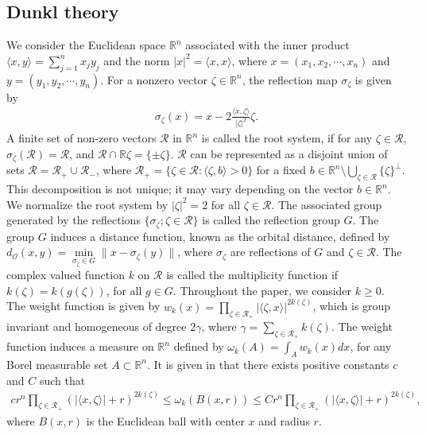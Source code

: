 \documentclass[11pt, reqno]{amsproc}
\theoremstyle{definition}
\theoremstyle{remark}
\numberwithin{equation}{section}
\begin{document}
\subsection{Dunkl theory}
We consider the Euclidean space $\mathbb{R}^n$ associated with the inner product $\langle x, y \rangle = \sum_{j=1}^n x_jy_j$ and the norm $|x|^2= \langle x,x \rangle$, where $x=(x_1,x_2,\cdots, x_n )$ and $y=(y_1,y_2,\cdots, y_n)$. For a nonzero vector $\zeta \in \mathbb{R}^n$, the reflection map $\sigma_\zeta$ is given by 
\begin{align*}
    \sigma_\zeta(x)=x-2\frac{\langle x, \zeta \rangle}{|\zeta|^2}\zeta.
\end{align*} 
 A finite set of non-zero vectors $\mathcal{R}$ in $\mathbb{R}^n$ is called the root system, if for any $\zeta \in \mathcal{R}$, $\sigma_\zeta(\mathcal{R})=\mathcal{R}$, and $\mathcal{R}\cap \mathbb{R}\zeta=\{ \pm\zeta\}$. $\mathcal{R}$ can be represented as a disjoint union of sets $\mathcal{R}=\mathcal{R}_+ \cup \mathcal{R}_-$, where $\mathcal{R}_+=\{ \zeta \in \mathcal{R}: \langle \zeta, b \rangle >0\}$ for a fixed $b\in \mathbb{R}^n \setminus \bigcup\limits_{\zeta\in \mathcal{R}} \{\zeta\}^{\perp} $. This decomposition is not unique; it may vary depending on the vector $b\in \mathbb{R}^n$. We normalize the root system by $|\zeta|^2=2$ for all $\zeta \in \mathcal{R}$. The associated group generated by the reflections $\{\sigma_\zeta; \zeta \in \mathcal{R}\}$ is called the reflection group $G$. The group $G$ induces a distance function, known as the orbital distance, defined by $ d_\mathcal{O}(x,y)= \min \limits_{\sigma_\zeta\in G}\|x-\sigma_\zeta(y)\|$, where $\sigma_\zeta$ are reflections of $G$ and $\zeta\in \mathcal{R}$. The complex valued function $k$ on $\mathcal{R}$ is called the multiplicity function if $k(\zeta)=k(g(\zeta))$, for all $g\in G$. Throughout the paper, we consider $k \geq 0$. The weight function is given by $w_k(x)= \prod_{\zeta\in \mathcal{R}_+}|\langle \zeta,x\rangle|^{2k(\zeta)}$, which is group invariant and homogeneous of degree $2\gamma$, where $\gamma= \sum_{\zeta \in \mathcal{R}_+} k(\zeta)$. The weight function induces a measure on $\mathbb{R}^n$ defined by
$\omega_k(A)=\int_A w_k(x)dx$, for any Borel measurable set $A \subset\mathbb{R}^n$. It is given in \cite{Hejna-2019} that there exists positive constants $c $ and $C$ such that 
\begin{align*} 
    c r^n \prod\limits_{\zeta\in \mathcal{R}_+}\left( |\langle x,\zeta \rangle|+r\right)^{2k(\zeta)} \leq \omega_k(B(x,r)) \leq Cr^n \prod\limits_{\zeta\in \mathcal{R}_+}\left( |\langle x,\zeta \rangle|+r\right)^{2k(\zeta)},
\end{align*} where $B(x,r)$ is the Euclidean ball with center $x$ and radius $r$.
\end{document}
